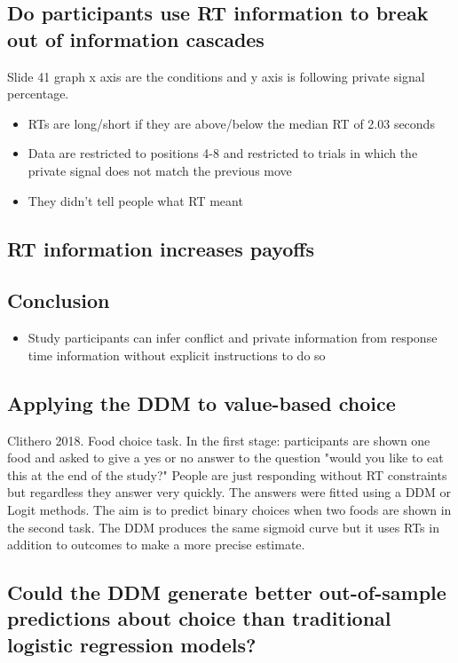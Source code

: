 \subsection{Do participants use RT information to break out of information cascades}
Slide 41 graph x axis are the conditions and y axis is following private signal percentage.
\begin{itemize}
    \item RTs are long/short if they are above/below the median RT of 2.03 seconds
    \item Data are restricted to positions 4-8 and restricted to trials in which the private signal does not match the previous move
    \item They didn't tell people what RT meant
\end{itemize}
\subsection{RT information increases payoffs}
\subsection{Conclusion}
\begin{itemize}
    \item Study participants can infer conflict and private information from response time information without explicit instructions to do so
\end{itemize}
\subsection{Applying the DDM to value-based choice}
Clithero 2018. Food choice task. In the first stage: participants are shown one food and asked to give a yes or no answer to the question "would you like to eat this at the end of the study?" People are just responding without RT constraints but regardless they answer very quickly. The answers were fitted using a DDM or Logit methods. The aim is to predict binary choices when two foods are shown in the second task. The DDM produces the same sigmoid curve but it uses RTs in addition to outcomes to make a more precise estimate.
\subsection{Could the DDM generate better out-of-sample predictions about choice than traditional logistic regression models?}
